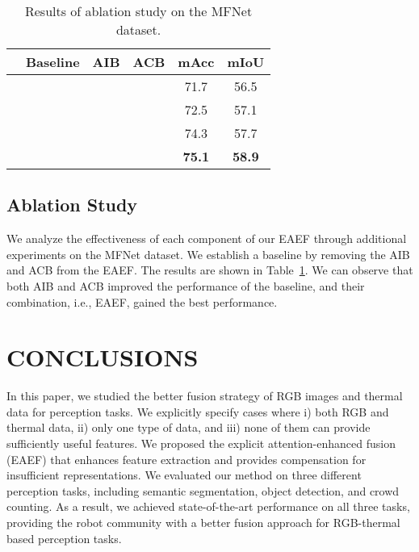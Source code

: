 \documentclass[letterpaper, 10 pt, journal, twoside]{IEEEtran}
\begin{document}
\begin{table}[htbp]
  \centering
  \caption{Results of ablation study on the MFNet dataset.}

  \renewcommand\arraystretch{1.2}
    \begin{tabular}{cccc|cc}
    \toprule
    & Baseline & AIB & ACB & mAcc & mIoU \\
    \hline
    \multicolumn{2}{c}{} &       &       & 71.7  & 56.5 \\
  \multicolumn{2}{c}{} &      &       & 72.5  & 57.1 \\
   \multicolumn{2}{c}{} &       &      & 74.3  & 57.7 \\
   \multicolumn{2}{c}{} &      &      & \textbf{75.1} & \textbf{58.9} \\
    \bottomrule
    \end{tabular}\label{ablstudy}
\end{table}


\subsection{Ablation Study}

We analyze the effectiveness of each component of our EAEF through additional experiments on the MFNet dataset. We establish a baseline by removing the AIB and ACB from the EAEF. The results are shown in Table~\ref{ablstudy}. We can observe that both AIB and ACB improved the performance of the baseline, and their combination, i.e., EAEF, gained the best performance. 




\section{CONCLUSIONS}
In this paper, we studied the better fusion strategy of RGB images and thermal data for perception tasks.
We explicitly specify cases where i) both RGB and thermal data, ii) only one type of data, and iii) none of them can provide sufficiently useful features.
We proposed the explicit attention-enhanced fusion (EAEF) that enhances feature extraction and provides compensation for insufficient representations. We evaluated our method on three different perception tasks, including semantic segmentation, object detection, and crowd counting. As a result, we achieved state-of-the-art performance on all three tasks, providing the robot community with a better fusion approach for RGB-thermal based perception tasks.










\ifCLASSOPTIONcaptionsoff
  \newpage
\fi
\end{document}

